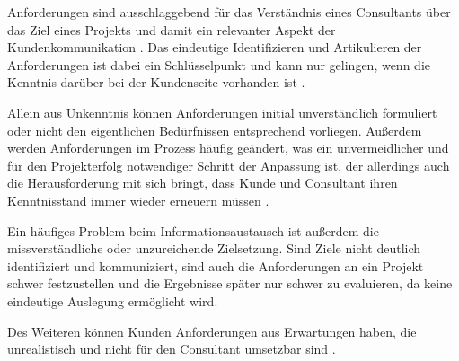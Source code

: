 \documentclass[../main.tex]{subfiles}
\begin{document}
Anforderungen sind ausschlaggebend für das Verständnis eines Consultants über das Ziel eines Projekts und damit ein relevanter Aspekt der Kundenkommunikation \autocite{davis2006communication}.
Das eindeutige Identifizieren und Artikulieren der Anforderungen ist dabei ein Schlüsselpunkt und kann nur gelingen, wenn die Kenntnis darüber bei der Kundenseite vorhanden ist \autocite{gamil2017identification, chakrabarti2004identification, salado2021systems}.

Allein aus Unkenntnis können Anforderungen initial unverständlich formuliert oder nicht den eigentlichen Bedürfnissen entsprechend vorliegen\autocite{bjarnason2017role}.
Außerdem werden Anforderungen im Prozess häufig geändert, was ein unvermeidlicher und für den Projekterfolg notwendiger Schritt der Anpassung ist, der allerdings auch die Herausforderung mit sich bringt, dass Kunde und Consultant ihren Kenntnisstand immer wieder erneuern müssen \autocite{oleff2022proaktives, davis2006communication, gamil2017identification}.

Ein häufiges Problem beim Informationsaustausch ist außerdem die missverständliche oder unzureichende Zielsetzung.
Sind Ziele nicht deutlich identifiziert und kommuniziert, sind auch die Anforderungen an ein Projekt schwer festzustellen und die Ergebnisse später nur schwer zu evaluieren, da keine eindeutige Auslegung ermöglicht wird.
\autocite{cothran2005developing,appelbaum2005critical}

Des Weiteren können Kunden Anforderungen aus Erwartungen haben, die unrealistisch und nicht für den Consultant umsetzbar sind \autocite{bjarnason2017role}.
\end{document}
